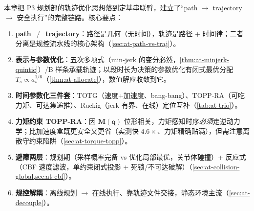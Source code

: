 本章把 P3 规划部的轨迹优化思想落到定基串联臂，建立了“path $\to$ trajectory $\to$ 安全执行”的完整链路。核心要点：
\begin{enumerate}
  \item \textbf{path $\ne$ trajectory}：路径是几何（无时间），轨迹是路径 + 时间律；二者分离是规控流水线的核心架构（\cref{sec:at-path-vs-traj}）。
  \item \textbf{表示与参数优化}：五次多项式（min-jerk 的变分必然，\cref{thm:at-minjerk-quintic}）/B 样条承载轨迹；以段时长为决策的参数优化有闭式最优分配 $T_s\propto a_s^{1/6}$（\cref{thm:at-allocate}），数值解应收敛到它。
  \item \textbf{时间参数化三件套}：TOTG（速度+加速度、bang-bang）、TOPP-RA（可吃力矩、可达集递推）、Ruckig（jerk 有界、在线）定位互补（\cref{tab:at-trio}）。
  \item \textbf{力矩约束 TOPP-RA}：因 $\mathbf{M}(\mathbf{q})$ 位形相关，力矩感知时序\emph{必须}走逆动力学；比加速度盒既更安全又更省（实测快 $4.6\times$、力矩精确贴满），但需注意离散守约束陷阱（\cref{sec:at-torque-topp}）。
  \item \textbf{避障两层}：规划期（采样概率完备 vs 优化局部最优，关节体碰撞）+ 反应式（CBF 速度滤波，单约束闭式投影 + 死锁/不可达破解）（\cref{sec:at-collision-global,sec:at-cbf}）。
  \item \textbf{规控解耦}：离线规划 $\to$ 在线执行、靠轨迹文件交接，静态环境主流（\cref{sec:at-decouple}）。
\end{enumerate}

